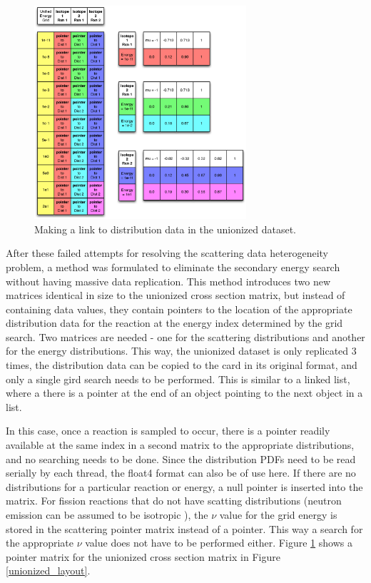 \begin{figure}[h!] 
\centering
\includegraphics[width=0.7\textwidth]{graphics/unionized_pointers.eps}
\caption{Making a link to distribution data in the unionized dataset. \label{unionized_pointers} }
\end{figure}

After these failed attempts for resolving the scattering data heterogeneity problem, a method was formulated to eliminate the secondary energy search without having massive data replication.  This method introduces two new matrices identical in size to the unionized cross section matrix, but instead of containing data values, they contain pointers to the location of the appropriate distribution data for the reaction at the energy index determined by the grid search.  Two matrices are needed - one for the scattering distributions and another for the energy distributions.  This way, the unionized dataset is only replicated 3 times, the distribution data can be copied to the card in its original format, and only a single gird search needs to be performed.  This is similar to a linked list, where a there is a pointer at the end of an object pointing to the next object in a list.  

In this case, once a reaction is sampled to occur, there is a pointer readily available at the same index in a second matrix to the appropriate distributions, and no searching needs to be done.  Since the distribution PDFs need to be read serially by each thread, the float4 format can also be of use here.  If there are no distributions for a particular reaction or energy, a null pointer is inserted into the matrix.  For fission reactions that do not have scatting distributions (neutron emission can be assumed to be isotropic \cite{openmc}), the $\nu$ value for the grid energy is stored in the scattering pointer matrix instead of a pointer.  This way a search for the appropriate $\nu$ value does not have to be performed either.  Figure \ref{unionized_pointers} shows a pointer matrix for the unionized cross section matrix in Figure \ref{unionized_layout}.

